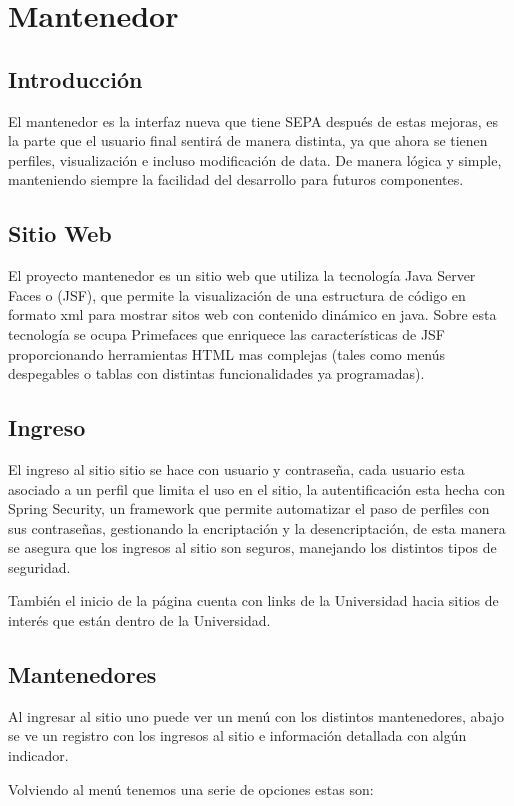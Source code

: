 \documentclass[a4paper,12pt,openany,oneside]{book}
\begin{document}
\chapter{Mantenedor}
\thispagestyle{empty}
\section{Introducción}

El mantenedor es la interfaz nueva que tiene SEPA después de estas mejoras, es la parte que el usuario final sentirá de manera distinta, ya que ahora se tienen perfiles, visualización e incluso modificación de data. De manera lógica y simple, manteniendo siempre la facilidad del desarrollo para futuros componentes.

\section{Sitio Web}
El proyecto mantenedor es un sitio web que utiliza la tecnología Java Server Faces o (JSF), que permite la visualización de una estructura de código en formato xml para mostrar sitos web con contenido dinámico en java. Sobre esta tecnología se ocupa Primefaces que enriquece las características de JSF proporcionando herramientas HTML mas complejas (tales como menús despegables o tablas con distintas funcionalidades ya programadas).
\section{Ingreso}
El ingreso al sitio sitio se hace con usuario y contraseña, cada usuario esta asociado a un perfil que limita el uso en el sitio, la autentificación esta hecha con Spring Security, un framework que permite automatizar el paso de perfiles con sus contraseñas, gestionando la encriptación y la desencriptación, de esta manera se asegura que los ingresos al sitio son seguros, manejando los distintos tipos de seguridad.

También el inicio de la página cuenta con links de la Universidad hacia sitios de interés que están dentro de la Universidad.
\section{Mantenedores}
Al ingresar al sitio uno puede ver un menú con los distintos mantenedores, abajo se ve un registro con los ingresos al sitio e información detallada con algún indicador.

Volviendo al menú tenemos una serie de opciones estas son:
\end{document}
